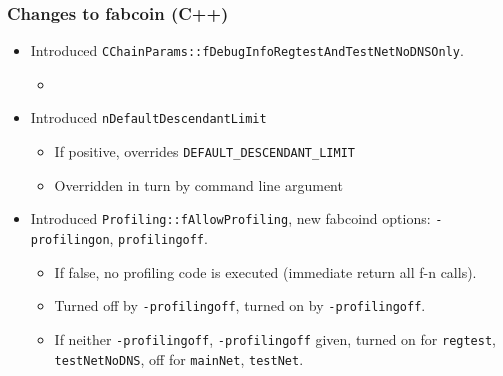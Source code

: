\begin{frame}[fragile]
\frametitle{Changes to fabcoin (C++)}
\begin{itemize}
\item Introduced \verb|CChainParams::fDebugInfoRegtestAndTestNetNoDNSOnly|.
\begin{itemize}
\item 
\end{itemize}
\item Introduced  \verb|nDefaultDescendantLimit|
\begin{itemize}
	\item If positive, overrides \verb|DEFAULT_DESCENDANT_LIMIT|
	\item Overridden in turn by command line argument 
	
\end{itemize}

\item Introduced \verb|Profiling::fAllowProfiling|, new fabcoind options: \verb|-profilingon|, \verb|profilingoff|. 
\begin{itemize}
	\item If false, no profiling code is executed (immediate return all f-n calls).
	\item Turned off by \verb|-profilingoff|, turned on by \verb|-profilingoff|.
	\item If neither \verb|-profilingoff|, \verb|-profilingoff| given, turned on for \verb|regtest|, \verb|testNetNoDNS|,
	off for \verb|mainNet|, \verb|testNet|.
\end{itemize}

\end{itemize}

\end{frame}
